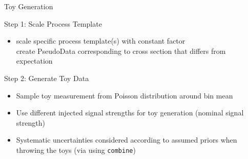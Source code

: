 \begin{frame}{Toy Generation}
%
%
\begin{block}{Step 1: Scale Process Template}
\begin{itemize}
\item scale specific process template(s) with constant factor\\
\rar create PseudoData corresponding to cross section that differs from expectation
\end{itemize}
\end{block}

\begin{block}{Step 2: Generate Toy Data}
\begin{itemize}
\item Sample toy measurement from Poisson distribution around bin mean
\item Use different injected signal strengths for toy generation (nominal signal strength)
\item Systematic uncertainties considered according to assumed priors when throwing the toys (via using \texttt{combine})
\end{itemize}
\end{block}

\end{frame}

